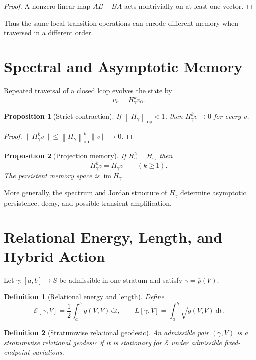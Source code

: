 \documentclass[11pt]{article}
\newtheorem{definition}{Definition}[section]
\newtheorem{proposition}{Proposition}[section]
\newcommand{\im}{\operatorname{im}}
\newcommand{\dd}{\,\mathrm{d}}
\newcommand{\opnorm}[1]{\left\lVert #1\right\rVert_{\mathrm{op}}}
\begin{document}
\begin{proof}
A nonzero linear map $AB-BA$ acts nontrivially on at least one vector.
\end{proof}

Thus the same local transition operations can encode different memory when
traversed in a different order.

\section{Spectral and Asymptotic Memory}
\label{sec:spectral}

Repeated traversal of a closed loop evolves the state by
\[
v_k=H_\gamma^k v_0.
\]

\begin{proposition}[Strict contraction]
If $\opnorm{H_\gamma}<1$, then $H_\gamma^k v\to0$ for every $v$.
\end{proposition}

\begin{proof}
$\|H_\gamma^k v\|\le\opnorm{H_\gamma}^k\|v\|\to0$.
\end{proof}

\begin{proposition}[Projection memory]
If $H_\gamma^2=H_\gamma$, then
\[
H_\gamma^k v=H_\gamma v
\qquad(k\ge1).
\]
The persistent memory space is $\im H_\gamma$.
\end{proposition}

More generally, the spectrum and Jordan structure of $H_\gamma$ determine
asymptotic persistence, decay, and possible transient amplification.

\section{Relational Energy, Length, and Hybrid Action}
\label{sec:geodesics}

Let $\gamma:[a,b]\to S$ be admissible in one stratum and satisfy
$\dot\gamma=\overline\rho(V)$.

\begin{definition}[Relational energy and length]
Define
\[
\mathcal E[\gamma,V]
=\frac12\int_a^b\overline g(V,V)\dd t,
\qquad
L[\gamma,V]
=\int_a^b\sqrt{\overline g(V,V)}\dd t.
\]
\end{definition}

\begin{definition}[Stratumwise relational geodesic]
An admissible pair $(\gamma,V)$ is a stratumwise relational geodesic if it is
stationary for $\mathcal E$ under admissible fixed-endpoint variations.
\end{definition}
\end{document}
